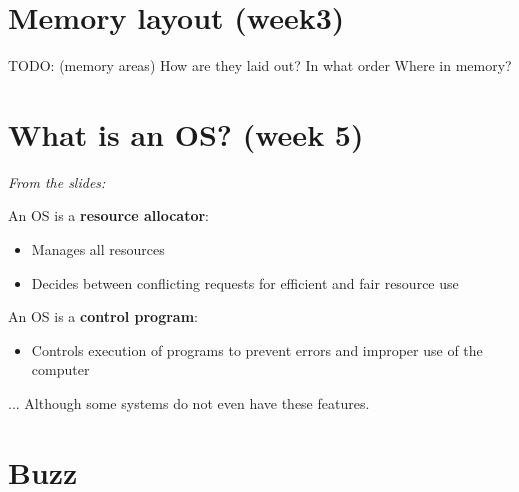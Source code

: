 \documentclass{article}
\begin{document}
\section*{Memory layout (week3)}
TODO: (memory areas) How are they laid out? In what order Where in memory?


\section*{What is an OS? (week 5)}
\emph{From the slides:}

An OS is a \textbf{resource allocator}:
\begin{itemize}
	\item Manages all resources
	\item Decides between conflicting requests for efficient and fair resource use
\end{itemize}

An OS is a \textbf{control program}:
\begin{itemize}
	\item Controls execution of programs to prevent errors and improper use of the computer
\end{itemize}

... Although some systems do not even have these features.


\section*{Buzz}

\end{document}
